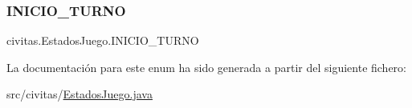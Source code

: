 \mbox{\label{enumcivitas_1_1EstadosJuego_a89f1dcbba3f71733636da0766dc7275b}} 
\subsubsection{\texorpdfstring{I\+N\+I\+C\+I\+O\+\_\+\+T\+U\+R\+NO}{INICIO\_TURNO}}
{\footnotesize\ttfamily civitas.\+Estados\+Juego.\+I\+N\+I\+C\+I\+O\+\_\+\+T\+U\+R\+NO}



La documentación para este enum ha sido generada a partir del siguiente fichero\+:\begin{DoxyCompactItemize}
\item 
src/civitas/\hyperlink{EstadosJuego_8java}{Estados\+Juego.\+java}\end{DoxyCompactItemize}
